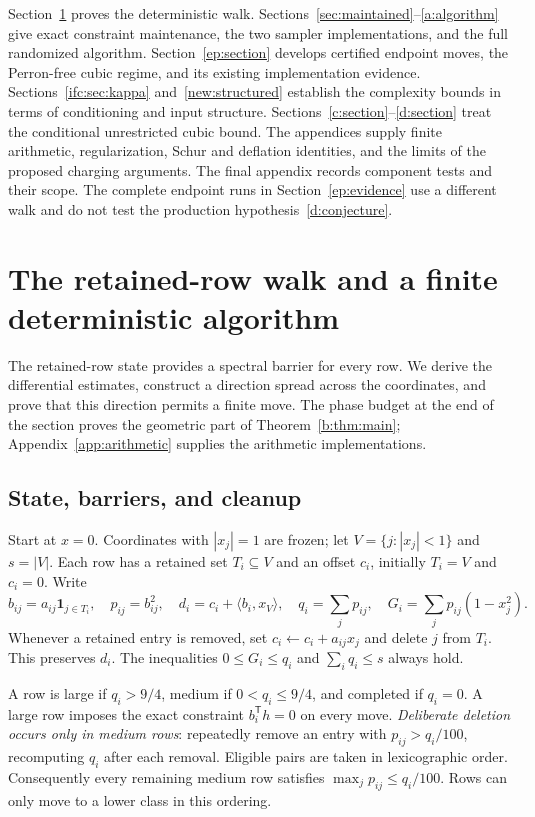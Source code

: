 \documentclass[11pt]{amsart}
\theoremstyle{definition}\newtheorem{definition}[theorem]{Definition}
\theoremstyle{remark}\newtheorem{remark}[theorem]{Remark}
\numberwithin{equation}{section}
\newcommand{\one}{\mathbf1}
\newcommand{\T}{\mathsf T}
\begin{document}
Section~\ref{sec:deterministic} proves the deterministic walk.
Sections~\ref{sec:maintained}--\ref{a:algorithm} give exact constraint
maintenance, the two sampler implementations, and the full randomized
algorithm. Section~\ref{ep:section} develops certified endpoint moves,
the Perron-free cubic regime, and its existing implementation evidence.
Sections~\ref{ifc:sec:kappa} and~\ref{new:structured} establish
the complexity bounds in terms of conditioning and input structure.
Sections~\ref{c:section}--\ref{d:section} treat the conditional unrestricted
cubic bound. The appendices supply finite arithmetic, regularization,
Schur and deflation identities, and the limits of the proposed charging
arguments. The final appendix records component tests and their scope.
The complete endpoint runs in Section~\ref{ep:evidence} use a different
walk and do not test the production hypothesis~\eqref{d:conjecture}.

\section{The retained-row walk and a finite deterministic algorithm}\label{sec:deterministic}
The retained-row state provides a spectral barrier for every row.
We derive the differential estimates, construct a direction spread across
the coordinates, and prove that this direction permits a finite move. The phase budget
at the end of the section proves the geometric part of
Theorem~\ref{b:thm:main}; Appendix~\ref{app:arithmetic} supplies
the arithmetic implementations.

\subsection{State, barriers, and cleanup}\label{b:sec:state}
Start at $x=0$. Coordinates with $|x_j|=1$ are frozen; let
$V=\{j:|x_j|<1\}$ and $s=|V|$. Each row has a retained set $T_i\subseteq V$
and an offset $c_i$, initially $T_i=V$ and $c_i=0$. Write
\[
 b_{ij}=a_{ij}\one_{j\in T_i},\quad p_{ij}=b_{ij}^2,\quad
 d_i=c_i+\langle b_i,x_V\rangle,\quad q_i=\sum_jp_{ij},\quad
 G_i=\sum_jp_{ij}(1-x_j^2).
\]
Whenever a retained entry is removed, set
$c_i\leftarrow c_i+a_{ij}x_j$ and delete $j$ from $T_i$.
This preserves $d_i$. The inequalities $0\le G_i\le q_i$ and
$\sum_iq_i\le s$ always hold.

A row is large if $q_i>9/4$, medium if $0<q_i\le9/4$, and completed if
$q_i=0$. A large row imposes the exact constraint $b_i^\T h=0$ on every move.
\emph{Deliberate deletion occurs only in medium rows}: repeatedly remove an
entry with $p_{ij}>q_i/100$, recomputing $q_i$ after each removal. Eligible
pairs are taken in lexicographic order. Consequently every remaining medium
row satisfies $\max_jp_{ij}\le q_i/100$. Rows can only move to a lower class in this ordering.
\end{document}
